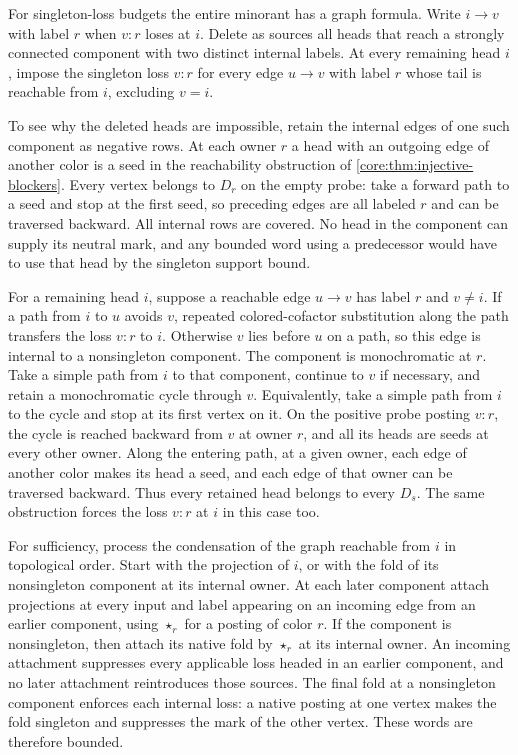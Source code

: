 For singleton-loss budgets the entire minorant has a
graph formula. Write $i\to v$ with label $r$ when
$v:r$ loses at $i$. Delete as sources all heads that
reach a strongly connected component with two distinct
internal labels. At every remaining head $i$, impose
the singleton loss $v:r$ for every edge $u\to v$
with label $r$ whose tail is reachable from $i$,
excluding $v=i$.

To see why the deleted heads are impossible, retain
the internal edges of one such component as negative
rows. At each owner $r$ a head with an outgoing edge
of another color is a seed in the reachability
obstruction of \cref{core:thm:injective-blockers}.
Every vertex belongs to $D_r$ on the empty probe:
take a forward path to a seed and stop at the first
seed, so preceding edges are all labeled $r$ and
can be traversed backward. All internal rows are
covered. No head in the component can supply its
neutral mark, and any bounded word using a predecessor
would have to use that head by the singleton support
bound.

For a remaining head $i$, suppose a reachable edge
$u\to v$ has label $r$ and $v\ne i$. If a path from
$i$ to $u$ avoids $v$, repeated colored-cofactor
substitution along the path transfers the loss
$v:r$ to $i$. Otherwise $v$ lies before $u$ on a
path, so this edge is internal to a nonsingleton
component. The component is monochromatic at $r$.
Take a simple path from $i$ to that component,
continue to $v$ if necessary, and retain a
monochromatic cycle through $v$. Equivalently,
take a simple path from $i$ to the cycle and stop
at its first vertex on it. On the positive probe
posting $v:r$, the cycle is reached backward from
$v$ at owner $r$, and all its heads are seeds at
every other owner. Along the entering path, at a
given owner, each edge of another color makes its
head a seed, and each edge of that owner can be
traversed backward. Thus every retained head
belongs to every $D_s$. The same obstruction
forces the loss $v:r$ at $i$ in this case too.

For sufficiency, process the condensation of the
graph reachable from $i$ in topological order.
Start with the projection of $i$, or with the
fold of its nonsingleton component at its internal
owner. At each later component attach projections
at every input and label appearing on an incoming
edge from an earlier component, using $\star_r$
for a posting of color $r$. If the component is
nonsingleton, then attach its native fold by
$\star_r$ at its internal owner. An incoming
attachment suppresses every applicable loss
headed in an earlier component, and no later
attachment reintroduces those sources. The final
fold at a nonsingleton component enforces each
internal loss: a native posting at one vertex
makes the fold singleton and suppresses the
mark of the other vertex. These words are
therefore bounded.

